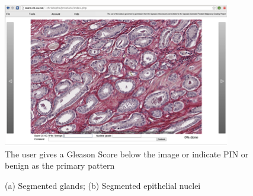 {\begin{enumerate}
\begin{figure}[!htbp]
	\centering
	\includegraphics[width=.6\textwidth]{figures/research/userinterfaceprostate.png}
	\caption{The user gives a Gleason Score below the image or indicate PIN or benign as the primary pattern} 
	\label{fig:userintpros}
\end{figure}

\begin{figure}[!htbp]
	\centering
	\caption{(a) Segmented glands; (b) Segmented epithelial nuclei}
	\label{fig:segglandpros}
\end{figure}


\newpage




\end{enumerate}}
